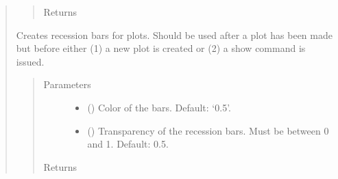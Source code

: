 \documentclass[letterpaper,10pt,openany,oneside,english]{sphinxmanual}
\begin{document}
\begin{fulllineitems}
\begin{quote}
\begin{fulllineitems}
\begin{quote}
\begin{description}
\item[{Returns}] \leavevmode
{\hyperref[\detokenize{series_class:fredpy.series}]{}}

\end{description}\end{quote}

\end{fulllineitems}


\begin{fulllineitems}
\label{\detokenize{series_class:fredpy.series.recessions}}
Creates recession bars for plots. Should be used after a plot has been made but before either (1) a new plot is created or (2) a show command is issued.
\begin{quote}\begin{description}
\item[{Parameters}] \leavevmode\begin{itemize}
\item {} 
 () \textendash{} Color of the bars. Default: ‘0.5’.

\item {} 
 () \textendash{} Transparency of the recession bars. Must be between 0 and 1. Default: 0.5.

\end{itemize}

\item[{Returns}] \leavevmode


\end{description}\end{quote}

\end{fulllineitems}



\end{quote}
\end{fulllineitems}
\end{document}
